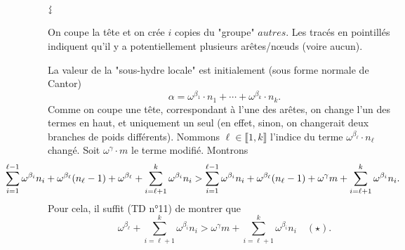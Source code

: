 \documentclass{../notes}
\begin{document}
\begin{enumerate}
      \begin{adjustbox}{center}
        {\LARGE $ \vertical\leadsto $}
      \end{adjustbox}

      \begin{adjustbox}{center}
      \end{adjustbox}

      On coupe la tête et on crée $i$ copies du "groupe" $\mathit{autres}$.
      Les tracés en pointillés indiquent qu'il y a potentiellement plusieurs arêtes/nœuds (voire aucun).

      La valeur de la "sous-hydre locale" est initialement (sous forme normale de Cantor) \[
      \alpha = \omega^{\beta_1} \cdot n_1 + \cdots + \omega^{\beta_k} \cdot n_k
      .\]
      Comme on coupe une tête, correspondant à l'une des arêtes, on change l'un des termes en haut, et uniquement un seul (en effet, sinon, on changerait deux branches de poids différents).
      Nommons $\ell \in \llbracket 1, k\rrbracket$ l'indice du terme $\omega^{\beta_\ell} \cdot n_\ell$ changé.
      Soit $\omega^{\gamma} \cdot m$ le terme modifié.
      Montrons \[
        \hspace{-4.5em}
        \sum_{i=1}^{\ell-1} \omega^{\beta_i} n_i 
        +
        \omega^{\beta_\ell} (n_\ell - 1) + 
        \omega^{\beta_\ell}
        +
        \sum_{i=\ell+1}^{k} \omega^{\beta_i} n_i > 
        \sum_{i=1}^{\ell-1} \omega^{\beta_i} n_i 
        +
        \omega^{\beta_\ell} (n_\ell - 1) + 
        \omega^{\gamma} m
        +
        \sum_{i=\ell+1}^{k} \omega^{\beta_i} n_i
      .\]
      Pour cela, il suffit (TD n°11) de montrer que \[
        \omega^{\beta_\ell}
        +
        \sum_{i=\ell+1}^{k} \omega^{\beta_i} n_i > 
        \omega^{\gamma} m
        +
        \sum_{i=\ell+1}^{k} \omega^{\beta_i} n_i
        \quad (\star)
      .\]


\end{enumerate}
\end{document}

